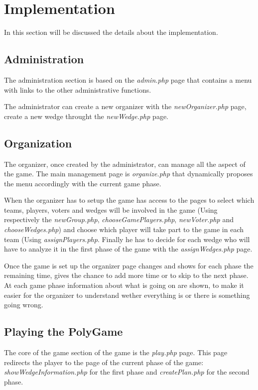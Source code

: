 \section{Implementation}
In this section will be discussed the details about the implementation.

\subsection{Administration}
The administration section is based on the \emph{admin.php} page that contains a menu with links to the other administrative functions.

The administrator can create a new organizer with the \emph{newOrganizer.php} page, create a new wedge throught the \emph{newWedge.php} page.

\subsection{Organization}
The organizer, once created by the administrator, can manage all the aspect of the game. The main management page is \emph{organize.php} that dynamically proposes the menu accordingly with the current game phase.

When the organizer has to setup the game has access to the pages to select which teams, players, voters and wedges will be involved in the game (Using respectively the \emph{newGroup.php}, \emph{chooseGamePlayers.php}, \emph{newVoter.php} and \emph{chooseWedges.php}) and choose which player will take part to the game in each team (Using \emph{assignPlayers.php}.
Finally he has to decide for each wedge who will have to analyze it in the first phase of the game with the \emph{assignWedges.php} page.

Once the game is set up the organizer page changes and shows for each phase the remaining time, gives the chance to add more time or to skip to the next phase. At each game phase information about what is going on are shown, to make it easier for the organizer to understand wether everything is or there is something going wrong.

\subsection{Playing the PolyGame}
The core of the game section of the game is the \emph{play.php} page. This page redirects the player to the page of the current phase of the game: \emph{showWedgeInformation.php} for the first phase and \emph{createPlan.php} for the second phase.

